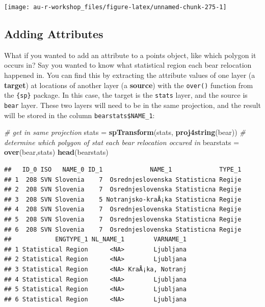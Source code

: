 \documentclass[]{book}
\newenvironment{Shaded}{\begin{snugshade}}{\end{snugshade}}
\newcommand{\KeywordTok}[1]{\textcolor[rgb]{0.13,0.29,0.53}{\textbf{#1}}}
\newcommand{\StringTok}[1]{\textcolor[rgb]{0.31,0.60,0.02}{#1}}
\newcommand{\CommentTok}[1]{\textcolor[rgb]{0.56,0.35,0.01}{\textit{#1}}}
\newcommand{\NormalTok}[1]{#1}
\theoremstyle{definition}
\theoremstyle{definition}
\theoremstyle{definition}
\theoremstyle{remark}
\begin{document}
\begin{center}\texttt{[image: au-r-workshop\_files/figure-latex/unnamed-chunk-275-1]} \end{center}

\subsection{Adding Attributes}\label{add-attr}

What if you wanted to add an attribute to a points object, like which
polygon it occurs in? Say you wanted to know what statistical region
each bear relocation happened in. You can find this by extracting the
attribute values of one layer (a \textbf{target}) at locations of
another layer (a \textbf{source}) with the \texttt{over()} function from
the \texttt{\{sp\}} package. In this case, the target is the
\texttt{stats} layer, and the source is \texttt{bear} layer. These two
layers will need to be in the same projection, and the result will be
stored in the column \texttt{bearstats\$NAME\_1}:

\begin{Shaded}
\begin{Highlighting}[]
\CommentTok{# get in same projection}
\NormalTok{stats =}\StringTok{ }\KeywordTok{spTransform}\NormalTok{(stats, }\KeywordTok{proj4string}\NormalTok{(bear))}
\CommentTok{# determine which polygon of stat each bear relocation occured in}
\NormalTok{bearstats =}\StringTok{ }\KeywordTok{over}\NormalTok{(bear,stats)}
\KeywordTok{head}\NormalTok{(bearstats)}
\end{Highlighting}
\end{Shaded}

\begin{verbatim}
##   ID_0 ISO   NAME_0 ID_1             NAME_1             TYPE_1
## 1  208 SVN Slovenia    7  Osrednjeslovenska Statisticna Regije
## 2  208 SVN Slovenia    7  Osrednjeslovenska Statisticna Regije
## 3  208 SVN Slovenia    5 Notranjsko-kraÅ¡ka Statisticna Regije
## 4  208 SVN Slovenia    7  Osrednjeslovenska Statisticna Regije
## 5  208 SVN Slovenia    7  Osrednjeslovenska Statisticna Regije
## 6  208 SVN Slovenia    7  Osrednjeslovenska Statisticna Regije
##            ENGTYPE_1 NL_NAME_1        VARNAME_1
## 1 Statistical Region      <NA>        Ljubljana
## 2 Statistical Region      <NA>        Ljubljana
## 3 Statistical Region      <NA> KraÅ¡ka, Notranj
## 4 Statistical Region      <NA>        Ljubljana
## 5 Statistical Region      <NA>        Ljubljana
## 6 Statistical Region      <NA>        Ljubljana
\end{verbatim}
\end{document}

